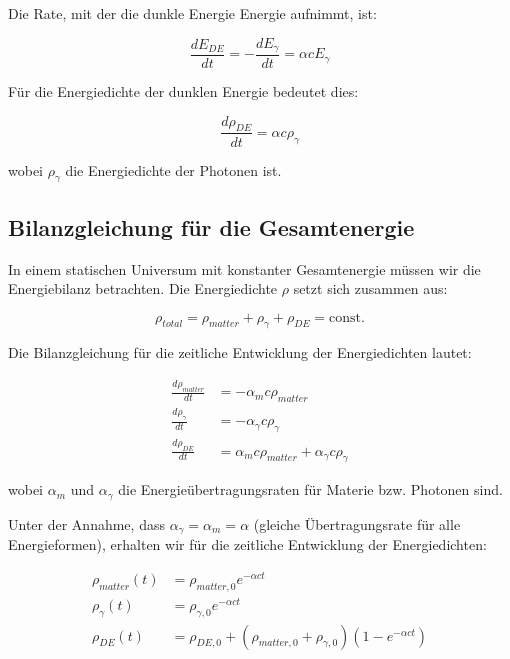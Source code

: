 \documentclass[a4paper,12pt]{article}
\theoremstyle{definition}
\theoremstyle{remark}
\begin{document}
	Die Rate, mit der die dunkle Energie Energie aufnimmt, ist:
	
	\begin{equation}
		\frac{dE_{DE}}{dt} = -\frac{dE_{\gamma}}{dt} = \alpha c E_{\gamma}
	\end{equation}
	
	Für die Energiedichte der dunklen Energie bedeutet dies:
	
	\begin{equation}
		\frac{d\rho_{DE}}{dt} = \alpha c \rho_{\gamma}
	\end{equation}
	
	wobei $\rho_{\gamma}$ die Energiedichte der Photonen ist.
	
	\subsection{Bilanzgleichung für die Gesamtenergie}
	In einem statischen Universum mit konstanter Gesamtenergie müssen wir die Energiebilanz betrachten. Die Energiedichte $\rho$ setzt sich zusammen aus:
	
	\begin{equation}
		\rho_{total} = \rho_{matter} + \rho_{\gamma} + \rho_{DE} = \text{const.}
	\end{equation}
	
	Die Bilanzgleichung für die zeitliche Entwicklung der Energiedichten lautet:
	
	\begin{align}
		\frac{d\rho_{matter}}{dt} &= -\alpha_{m} c \rho_{matter} \\
		\frac{d\rho_{\gamma}}{dt} &= -\alpha_{\gamma} c \rho_{\gamma} \\
		\frac{d\rho_{DE}}{dt} &= \alpha_{m} c \rho_{matter} + \alpha_{\gamma} c \rho_{\gamma}
	\end{align}
	
	wobei $\alpha_{m}$ und $\alpha_{\gamma}$ die Energieübertragungsraten für Materie bzw. Photonen sind.
	
	Unter der Annahme, dass $\alpha_{\gamma} = \alpha_{m} = \alpha$ (gleiche Übertragungsrate für alle Energieformen), erhalten wir für die zeitliche Entwicklung der Energiedichten:
	
	\begin{align}
		\rho_{matter}(t) &= \rho_{matter,0} e^{-\alpha c t} \\
		\rho_{\gamma}(t) &= \rho_{\gamma,0} e^{-\alpha c t} \\
		\rho_{DE}(t) &= \rho_{DE,0} + (\rho_{matter,0} + \rho_{\gamma,0})(1 - e^{-\alpha c t})
	\end{align}
	
\end{document}

